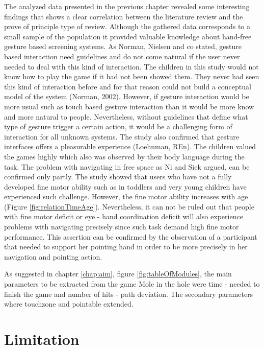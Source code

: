 The analyzed data presented in the previous chapter revealed some interesting findings that shows a clear correlation between the literature review and the prove of principle type of review. Although the gathered data corresponds to a small sample of the population it provided valuable knowledge about hand-free gesture based screening systems. As Norman, Nielsen and co stated, gesture based interaction need guidelines and do not come natural if the user never needed to deal with this kind of interaction. The children in this study would not know how to play the game if it had not been showed them. They never had seen this kind of interaction before and for that reason could not build a conceptual model of the system (Norman, 2002). However, if gesture interaction would be more usual such as touch based gesture interaction than it would be more know and more natural to people. Nevertheless, without guidelines that define what type of gesture trigger a certain action, it would be a challenging form of interaction for all unknown systems. 
The study also confirmed that gesture interfaces offers a pleasurable experience (Loehnman, REn). The children valued the games highly which also was observed by their body language during the task. 
The problem with navigating in free space as Ni and Siek argued, can be confirmed only partly. The study showed that users who have not a fully developed fine motor ability such as in toddlers and very young children have experienced such challenge. However, the fine motor ability increases with age (Figure \ref{fig:relationTimeAge}). Nevertheless, it can not be ruled out that people with fine motor deficit or eye - hand coordination deficit will also experience problems with navigating precisely since such task demand high fine motor performance. This assertion can be confirmed by the observation of a participant that needed to support her pointing hand in order to be more precisely in her navigation and pointing action. 

As suggested in chapter \ref{chap:aim}, figure \ref{fig:tableOfModules}, the main parameters to be extracted from the game Mole in the hole were time - needed to finish the game and number of hits - path deviation. The secondary parameters where touchzone and pointable extended. 






\section{Limitation}

